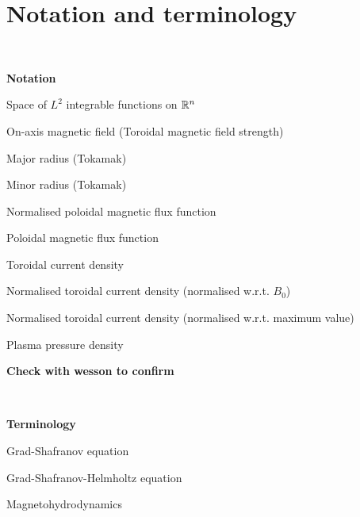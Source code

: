 

\chapter{Notation and terminology}\label{notation}

\renewcommand{\thefootnote}{\fnsymbol{footnote}}


\

\noindent\textbf{Notation}


\newcommand{\nttn}[2]{\item[{\ \makebox[3.18cm][l]{#1}}]{#2}}
\begin{list}{}{ \setlength{\leftmargin}{3.4cm}
                \setlength{\labelwidth}{3.4cm}}

\nttn{$L^2(\R^n)$}{Space of $L^2$ integrable functions on $\mathbb{R}^n$}

\nttn{$B_0$}{On-axis magnetic field (Toroidal magnetic field strength)}
\nttn{$R_0$}{Major radius (Tokamak)}
\nttn{$a$}{Minor radius (Tokamak)}
\nttn{$\psi$}{Normalised poloidal magnetic flux function}
\nttn{$\Psi$}{Poloidal magnetic flux function}
\nttn{$J_{\phi}$}{Toroidal current density}
\nttn{$j_{\phi}$}{Normalised toroidal current density (normalised w.r.t. $B_0$)}
\nttn{$I_{\rho}$}{Normalised toroidal current density (normalised w.r.t. maximum value)}
\nttn{$p$}{Plasma pressure density}
\nttn{$\beta$}{\textbf{Check with wesson to confirm}}

\end{list}

\

\noindent\textbf{Terminology}


\newcommand{\term}[2]{\item[{\ \makebox[4.58cm][l]{#1}}]{#2}}
\begin{list}{}{ \setlength{\leftmargin}{4.8cm}
                \setlength{\labelwidth}{4.8cm}}


\term{GS / GSE}{Grad-Shafranov equation}
\term{GSH}{Grad-Shafranov-Helmholtz equation}
\term{MHD}{Magnetohydrodynamics}


\end{list}
